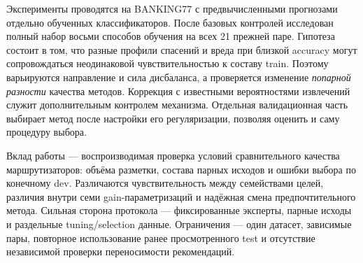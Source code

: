 Эксперименты проводятся на BANKING77 с предвычисленными прогнозами
отдельно обученных классификаторов. После базовых контролей исследован
полный набор восьми способов обучения на всех 21 прежней паре.
Гипотеза состоит в том, что разные профили спасений и вреда при близкой
accuracy могут сопровождаться неодинаковой чувствительностью к составу
train. Поэтому варьируются направление и сила дисбаланса, а проверяется
изменение \emph{попарной разности} качества методов. Коррекция с известными
вероятностями извлечений служит дополнительным контролем механизма.
Отдельная валидационная часть выбирает метод после настройки
его регуляризации, позволяя оценить и саму процедуру выбора.

Вклад работы --- воспроизводимая проверка условий сравнительного
качества маршрутизаторов: объёма разметки, состава парных исходов
и ошибки выбора по конечному dev. Различаются чувствительность
между семействами целей, различия внутри семи gain-параметризаций
и надёжная смена предпочтительного метода. Сильная сторона протокола
--- фиксированные эксперты, парные исходы и раздельные tuning/selection
данные. Ограничения --- один датасет, зависимые пары, повторное
использование ранее просмотренного test и отсутствие независимой
проверки переносимости рекомендаций.
